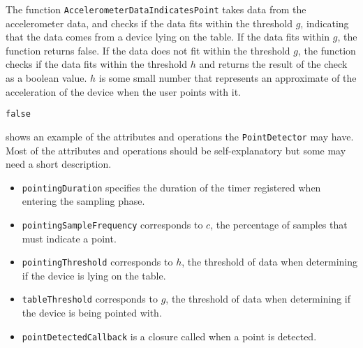 The function \texttt{AccelerometerDataIndicatesPoint} takes data from the accelerometer data, 
and checks if the data fits within the threshold $g$, 
indicating that the data comes from a device lying on the table. 
If the data fits within $g$, 
the function returns false. 
If the data does not fit within the threshold $g$, the function checks if the data fits within the threshold $h$ and returns the result of the check as a boolean value. $h$ is some small number that represents an approximate of the acceleration of the device when the user points with it.

\begin{algorithm}
  \begin{algorithmic}
    \State \Return \texttt{false}
    \Else
    \State \Return {}
    \EndIf
    \EndFunction
  \end{algorithmic}
\end{algorithm}

 shows an example of the attributes and operations the \texttt{PointDetector} may have. 
Most of the attributes and operations should be self-explanatory but some may need a short description.

\begin{itemize}
  \item \texttt{pointingDuration} specifies the duration of the timer registered when entering the sampling phase.
  \item \texttt{pointingSampleFrequency} corresponds to $c$, the percentage of samples that must indicate a point.
  \item \texttt{pointingThreshold} corresponds to $h$, the threshold of data when determining if the device is lying on the table.
  \item \texttt{tableThreshold} corresponds to $g$, the threshold of data when determining if the device is being pointed with.
  \item \texttt{pointDetectedCallback} is a closure called when a point is detected.
\end{itemize}

